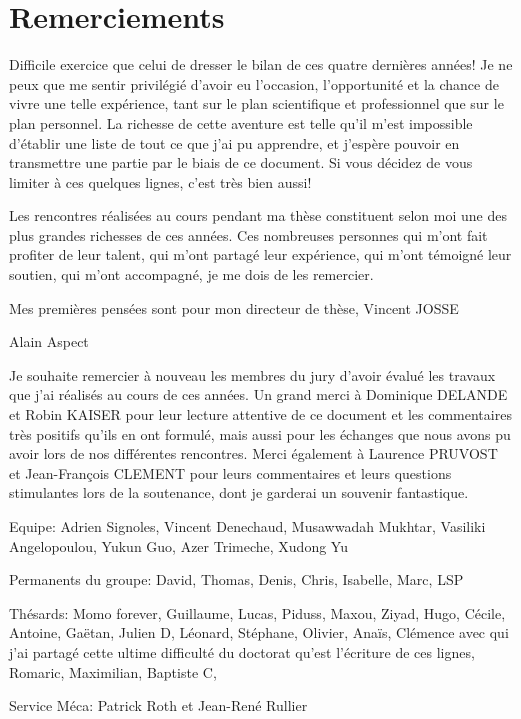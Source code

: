 \chapter*{Remerciements}

Difficile exercice que celui de dresser le bilan de ces quatre dernières années! Je ne peux que me sentir privilégié d'avoir eu l'occasion, l'opportunité et la chance de vivre une telle expérience, tant sur le plan scientifique et professionnel que sur le plan personnel. La richesse de cette aventure est telle qu'il m'est impossible d'établir une liste de tout ce que j'ai pu apprendre, et j'espère pouvoir en transmettre une partie par le biais de ce document. Si vous décidez de vous limiter à ces quelques lignes, c'est très bien aussi! 

Les rencontres réalisées au cours pendant ma thèse constituent selon moi une des plus grandes richesses de ces années. Ces nombreuses personnes qui m'ont fait profiter de leur talent, qui m'ont partagé leur expérience, qui m'ont témoigné leur soutien, qui m'ont accompagné, je me dois de les remercier.


Mes premières pensées sont pour mon directeur de thèse, Vincent JOSSE

Alain Aspect

Je souhaite remercier à nouveau les membres du jury d'avoir évalué les travaux que j'ai réalisés au cours de ces années. Un grand merci à Dominique DELANDE et Robin KAISER pour leur lecture attentive de ce document et les commentaires très positifs qu'ils en ont formulé, mais aussi pour les échanges que nous avons pu avoir lors de nos différentes rencontres. Merci également à Laurence PRUVOST et Jean-François CLEMENT pour leurs commentaires et leurs questions stimulantes lors de la soutenance, dont je garderai un souvenir fantastique. 

Equipe: Adrien Signoles, Vincent Denechaud, Musawwadah Mukhtar, Vasiliki Angelopoulou, Yukun Guo, Azer Trimeche, Xudong Yu

Permanents du groupe: David, Thomas, Denis, Chris, Isabelle, Marc, LSP

Thésards: Momo forever, Guillaume, Lucas, Piduss, Maxou, Ziyad, Hugo, Cécile, Antoine, Gaëtan, Julien D, Léonard, Stéphane, Olivier, Anaïs, Clémence avec qui j'ai partagé cette ultime difficulté du doctorat qu'est l'écriture de ces lignes, Romaric, Maximilian, Baptiste C, 


Service Méca: Patrick Roth et Jean-René Rullier

